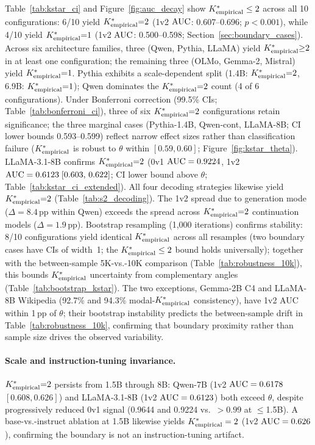 Table~\ref{tab:kstar_ci} and Figure~\ref{fig:auc_decay} show ${K^*_{\text{empirical}}} \leq 2$ across all 10 configurations: 6/10 yield ${K^*_{\text{empirical}}}{=}2$ (1v2 $\text{AUC}$: 0.607--0.696; $p < 0.001$), while 4/10 yield ${K^*_{\text{empirical}}}{=}1$ (1v2 $\text{AUC}$: 0.500--0.598; Section~\ref{sec:boundary_cases}).
Across six architecture families, three (Qwen, Pythia, LLaMA) yield ${K^*_{\text{empirical}}}{\geq}2$ in at least one configuration; the remaining three (OLMo, Gemma-2, Mistral) yield ${K^*_{\text{empirical}}}{=}1$.
Pythia exhibits a scale-dependent split (1.4B: ${K^*_{\text{empirical}}}{=}2$, 6.9B: ${K^*_{\text{empirical}}}{=}1$); Qwen dominates the ${K^*_{\text{empirical}}}{=}2$ count (4 of 6 configurations).
Under Bonferroni correction (99.5\% CIs; Table~\ref{tab:bonferroni_ci}), three of six ${K^*_{\text{empirical}}}{=}2$ configurations retain significance; the three marginal cases (Pythia-1.4B, Qwen-cont, LLaMA-8B; CI lower bounds 0.593--0.599) reflect narrow effect sizes rather than classification failure (${K^*_{\text{empirical}}}$ is robust to $\theta$ within $[0.59, 0.60]$; Figure~\ref{fig:kstar_theta}).
LLaMA-3.1-8B confirms ${K^*_{\text{empirical}}}{=}2$ (0v1 $\text{AUC} = 0.9224$, 1v2 $\text{AUC} = 0.6123\;[0.603,\,0.622]$; CI lower bound above $\theta$; Table~\ref{tab:kstar_ci_extended}).
All four decoding strategies likewise yield ${K^*_{\text{empirical}}}{=}2$ (Table~\ref{tab:s2_decoding}).
The 1v2 spread due to generation mode ($\Delta = 8.4$\,pp within Qwen) exceeds the spread across ${K^*_{\text{empirical}}}{=}2$ continuation models ($\Delta = 1.9$\,pp).
Bootstrap resampling (1{,}000 iterations) confirms stability: 8/10 configurations yield identical ${K^*_{\text{empirical}}}$ across all resamples (two boundary cases have CIs of width~1; the ${K^*_{\text{empirical}}} \leq 2$ bound holds universally); together with the between-sample 5K-vs.-10K comparison (Table~\ref{tab:robustness_10k}), this bounds ${K^*_{\text{empirical}}}$ uncertainty from complementary angles (Table~\ref{tab:bootstrap_kstar}).
The two exceptions, Gemma-2B C4 and LLaMA-8B Wikipedia (92.7\% and 94.3\% modal-${K^*_{\text{empirical}}}$ consistency), have 1v2 AUC within 1\,pp of $\theta$; their bootstrap instability predicts the between-sample drift in Table~\ref{tab:robustness_10k}, confirming that boundary proximity rather than sample size drives the observed variability.

\paragraph{Scale and instruction-tuning invariance.}
${K^*_{\text{empirical}}}{=}2$ persists from 1.5B through 8B: Qwen-7B (1v2 $\text{AUC} = 0.6178$ $[0.608, 0.626]$) and LLaMA-3.1-8B (1v2 $\text{AUC} = 0.6123$) both exceed $\theta$, despite progressively reduced 0v1 signal (0.9644 and 0.9224 vs.\ $> 0.99$ at $\leq$1.5B).
A base-vs.-instruct ablation at 1.5B likewise yields ${K^*_{\text{empirical}}} = 2$ (1v2 $\text{AUC} = 0.626$), confirming the boundary is not an instruction-tuning artifact.

